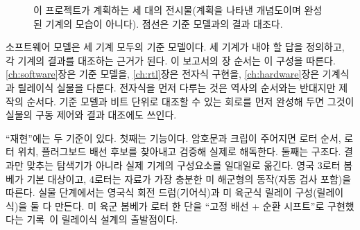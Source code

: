 \begin{figure}[ht]
\centering
{}
\caption{이 프로젝트가 계획하는 세 대의 전시물(계획을 나타낸 개념도이며 완성된 기계의 모습이 아니다).
점선은 기준 모델과의 결과 대조다.}
\label{fig:three-machines}
\end{figure}

소프트웨어 모델은 세 기계 모두의 기준 모델이다. 세 기계가 내야 할 답을 정의하고, 각 기계의 결과를 대조하는
근거가 된다. 이 보고서의 장 순서는 이 구성을 따른다. \ref{ch:software}장은 기준 모델을, \ref{ch:rtl}장은
전자식 구현을, \ref{ch:hardware}장은 기계식과 릴레이식 실물을 다룬다. 전자식을 먼저 다루는 것은 역사의
순서와는 반대지만 제작의 순서다. 기준 모델과 비트 단위로 대조할 수 있는 회로를 먼저 완성해 두면 그것이
실물의 구동 제어와 결과 대조에도 쓰인다.

``재현''에는 두 기준이 있다. 첫째는 기능이다. 암호문과 크립이 주어지면 로터 순서, 로터 위치,
플러그보드 배선 후보를 찾아내고 검증해 실제로 해독한다. 둘째는 구조다. 결과만 맞추는 탐색기가 아니라
실제 기계의 구성요소를 일대일로 옮긴다. 영국 3로터 봄베가 기본 대상이고, 4로터는 자료가 가장 충분한
미 해군형의 동작(자동 검사 포함)을 따른다. 실물 단계에서는 영국식 회전 드럼(기어식)과 미 육군식
릴레이 구성(릴레이식)을 둘 다 만든다. 미 육군 봄베가 로터 한 단을 ``고정 배선 + 순환 시프트''로
구현했다는 기록~\cite{dturing2021army}이 릴레이식 설계의 출발점이다.

